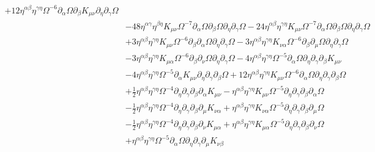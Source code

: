 \documentclass[10pt,letterpaper]{article}
\begin{document}
\begin{align}
 + 12 \eta^{\alpha \beta} \eta^{\gamma \eta} \Omega^{-6} \partial_{\alpha}\Omega \partial_{\beta}K_{\mu \nu} \partial_{\eta}\partial_{\gamma}\Omega\nonumber\\
& - 48 \eta^{\alpha \gamma} \eta^{\beta \eta} K_{\mu \nu} \Omega^{-7} \partial_{\alpha}\Omega \partial_{\beta}\Omega \partial_{\eta}\partial_{\gamma}\Omega
 - 24 \eta^{\alpha \beta} \eta^{\gamma \eta} K_{\mu \nu} \Omega^{-7} \partial_{\alpha}\Omega \partial_{\beta}\Omega \partial_{\eta}\partial_{\gamma}\Omega\nonumber\\
& + 3 \eta^{\alpha \beta} \eta^{\gamma \eta} K_{\mu \nu} \Omega^{-6} \partial_{\beta}\partial_{\alpha}\Omega \partial_{\eta}\partial_{\gamma}\Omega
 - 3 \eta^{\alpha \beta} \eta^{\gamma \eta} K_{\nu \alpha} \Omega^{-6} \partial_{\beta}\partial_{\mu}\Omega \partial_{\eta}\partial_{\gamma}\Omega\nonumber\\
& - 3 \eta^{\alpha \beta} \eta^{\gamma \eta} K_{\mu \alpha} \Omega^{-6} \partial_{\beta}\partial_{\nu}\Omega \partial_{\eta}\partial_{\gamma}\Omega
 - 4 \eta^{\alpha \beta} \eta^{\gamma \eta} \Omega^{-5} \partial_{\alpha}\Omega \partial_{\eta}\partial_{\gamma}\partial_{\beta}K_{\mu \nu}\nonumber\\
& - 4 \eta^{\alpha \beta} \eta^{\gamma \eta} \Omega^{-5} \partial_{\alpha}K_{\mu \nu} \partial_{\eta}\partial_{\gamma}\partial_{\beta}\Omega
 + 12 \eta^{\alpha \beta} \eta^{\gamma \eta} K_{\mu \nu} \Omega^{-6} \partial_{\alpha}\Omega \partial_{\eta}\partial_{\gamma}\partial_{\beta}\Omega\nonumber\\
& + \tfrac{1}{2} \eta^{\alpha \beta} \eta^{\gamma \eta} \Omega^{-4} \partial_{\eta}\partial_{\gamma}\partial_{\beta}\partial_{\alpha}K_{\mu \nu}
 -  \eta^{\alpha \beta} \eta^{\gamma \eta} K_{\mu \nu} \Omega^{-5} \partial_{\eta}\partial_{\gamma}\partial_{\beta}\partial_{\alpha}\Omega\nonumber\\
& -  \tfrac{1}{2} \eta^{\alpha \beta} \eta^{\gamma \eta} \Omega^{-4} \partial_{\eta}\partial_{\gamma}\partial_{\beta}\partial_{\mu}K_{\nu \alpha}
 + \eta^{\alpha \beta} \eta^{\gamma \eta} K_{\nu \alpha} \Omega^{-5} \partial_{\eta}\partial_{\gamma}\partial_{\beta}\partial_{\mu}\Omega\nonumber\\
& -  \tfrac{1}{2} \eta^{\alpha \beta} \eta^{\gamma \eta} \Omega^{-4} \partial_{\eta}\partial_{\gamma}\partial_{\beta}\partial_{\nu}K_{\mu \alpha}
 + \eta^{\alpha \beta} \eta^{\gamma \eta} K_{\mu \alpha} \Omega^{-5} \partial_{\eta}\partial_{\gamma}\partial_{\beta}\partial_{\nu}\Omega\nonumber\\
& + \eta^{\alpha \beta} \eta^{\gamma \eta} \Omega^{-5} \partial_{\alpha}\Omega \partial_{\eta}\partial_{\gamma}\partial_{\mu}K_{\nu \beta}

\end{align}
\end{document}

